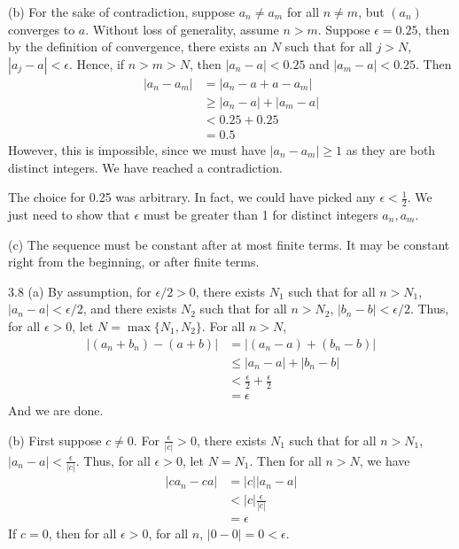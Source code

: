 (b) For the sake of contradiction, suppose $a_n \neq a_m$ for all $n \neq m$, but $(a_n)$ converges to $a$. Without loss of generality, assume $n > m$. Suppose $\epsilon = 0.25$, then by the definition of convergence, there exists an $N$ such that for all $j>N$, $|a_j-a|<\epsilon$. Hence, if $n>m>N$, then $|a_n-a|<0.25$ and $|a_m-a|<0.25$. Then
\begin{align}
    |a_n-a_m| &= |a_n - a + a - a_m| \\
    &\geq |a_n - a| + |a_m - a| \\
    &< 0.25 + 0.25 \\
    &= 0.5
\end{align}
However, this is impossible, since we must have $|a_n-a_m|\geq 1$ as they are both distinct integers. We have reached a contradiction. 
\begin{remark}
    The choice for 0.25 was arbitrary. In fact, we could have picked any $\epsilon < \frac{1}{2}$. We just need to show that $\epsilon$ must be greater than 1 for distinct integers $a_n, a_m$.
\end{remark}

(c) The sequence must be constant after at most finite terms. It may be constant right from the beginning, or after finite terms. 

3.8 (a) By assumption, for $\epsilon/2 > 0$, there exists $N_1$ such that for all $n > N_1$, $|a_n-a|<\epsilon/2$, and there exists $N_2$ such that for all $n > N_2$, $|b_n-b|<\epsilon/2$. Thus, for all $\epsilon > 0$, let $N=\max\{N_1, N_2\}$. For all $n>N$,
\begin{align}
    |(a_n + b_n)-(a+b)| &= |(a_n - a) + (b_n - b)| \\
                        &\leq |a_n-a| + |b_n-b| \\
                        &< \frac{\epsilon}{2} + \frac{\epsilon}{2} \\
                        &= \epsilon
\end{align} 
And we are done.

(b) First suppose $c \neq 0$. For $\frac{\epsilon}{|c|}>0$, there exists $N_1$ such that for all $n > N_1$, $|a_n-a| < \frac{\epsilon}{|c|}$. Thus, for all $\epsilon>0$, let $N=N_1$. Then for all $n>N$, we have
\begin{align}
    |ca_n-ca| &= |c||a_n-a| \\
              &< |c|\frac{\epsilon}{|c|} \\
              &= \epsilon
\end{align} 
If $c = 0$, then for all $\epsilon>0$, for all $n$, $|0-0|=0 < \epsilon$.

